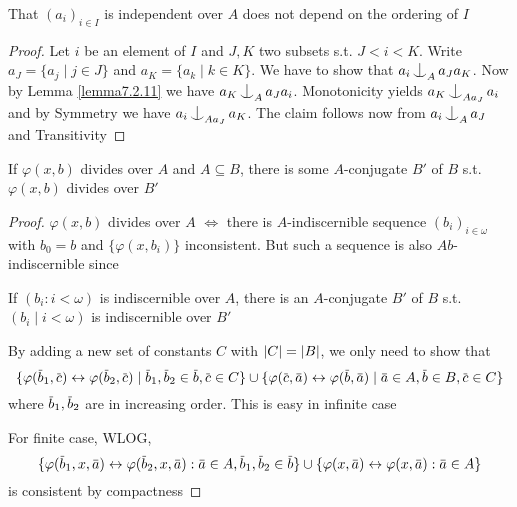 \documentclass[11pt]{article}
\begin{document}
\begin{corollary}[]
That \((a_i)_{i\in I}\) is independent over \(A\) does not depend on the ordering of \(I\)
\end{corollary}

\begin{proof}
Let \(i\) be an element of \(I\) and \(J,K\) two subsets s.t. \(J<i<K\).
Write \(a_J=\{a_j\mid j\in J\}\) and \(a_K=\{a_k\mid k\in K\}\). We have to show that \(a_i\ind_Aa_Ja_K\). Now
by Lemma \ref{lemma7.2.11} we have \(a_K\ind_Aa_Ja_i\). Monotonicity yields \(a_K\ind_{Aa_J}a_i\)
and by Symmetry we have \(a_i\ind_{Aa_J}a_K\). The claim follows now from \(a_i\ind_Aa_J\) and Transitivity
\end{proof}



\begin{exercise}
\label{ex7.2.4}
If \(\varphi(x,b)\) divides over \(A\) and \(A\subseteq B\), there is some \(A\)-conjugate \(B'\) of \(B\)
s.t. \(\varphi(x,b)\) divides over \(B'\)
\end{exercise}

\begin{proof}
\(\varphi(x,b)\) divides over \(A\) \(\Leftrightarrow\) there is \(A\)-indiscernible sequence \((b_i)_{i\in\omega}\)
with \(b_0=b\) and \(\{\varphi(x,b_i)\}\) inconsistent. But such a sequence is also \(Ab\)-indiscernible
since


If \((b_i:i<\omega)\) is indiscernible over \(A\), there is an \(A\)-conjugate \(B'\) of \(B\)
s.t. \((b_i\mid i<\omega)\) is indiscernible over \(B'\)

By adding a new set of constants \(C\) with \(\abs{C}=\abs{B}\), we only need to show that
    \begin{equation*}
    \{\varphi(\barb_1,\barc)\leftrightarrow\varphi(\barb_2,\barc)\mid\barb_1,\barb_2\in\barb,\barc\in C\}\cup
\{\varphi(\barc,\bara)\leftrightarrow\varphi(\barb,\bara)\mid\bara\in A,\barb\in B,\barc\in C\}
    \end{equation*}
where \(\barb_1,\barb_2\) are in increasing order. This is easy in infinite case

For finite case, WLOG,
\begin{equation*}
\{\varphi(\barb_1,x,\bara)\leftrightarrow\varphi(\barb_2,x,\bara):\bara\in A,\barb_1,\barb_2\in\barb\}\cup\{\varphi(x,\bara)\leftrightarrow\varphi(x,\bara):\bara\in A\}
\end{equation*}
is consistent by compactness
\end{proof}
\end{document}
